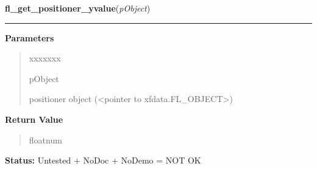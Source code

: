 \hspace{.8\funcindent}\begin{boxedminipage}{\funcwidth}

    \raggedright \textbf{fl\_get\_positioner\_yvalue}(\textit{pObject})

    \vspace{-1.5ex}

    \rule{\textwidth}{0.5\fboxrule}
\setlength{\parskip}{2ex}
\setlength{\parskip}{1ex}
      \textbf{Parameters}
      \vspace{-1ex}

      \begin{quote}
        \begin{Ventry}{xxxxxxx}

          \item[pObject]

          positioner object ({\textless}pointer to 
          xfdata.FL\_OBJECT{\textgreater})

        \end{Ventry}

      \end{quote}

      \textbf{Return Value}
    \vspace{-1ex}

      \begin{quote}
      floatnum

      \end{quote}

\textbf{Status:} Untested + NoDoc + NoDemo = NOT OK



    \end{boxedminipage}

    \label{xformslib:library:fl_set_positioner_ybounds}

    \vspace{0.5ex}

